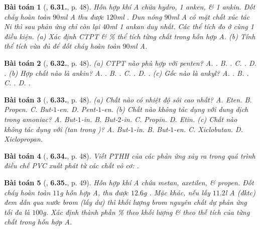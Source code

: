 \documentclass{article}
\numberwithin{equation}{section}
\newtheorem{baitoan}{Bài toán}[section]
\begin{document}
\begin{baitoan}[\cite{SBT_Hoa_Hoc_11_co_ban}, \textbf{6.31.}, p. 48]
	Hỗn hợp khí A chứa hydro, 1 anken, \& 1 ankin. Đốt cháy hoàn toàn $90$\emph{ml} A thu được $120$\emph{ml} \emph{}. Đun nóng $90$\emph{ml} A có mặt chất xúc tác \emph{Ni} thì sau phản ứng chỉ còn lại $40$\emph{ml} 1 ankan duy nhất. Các thể tích đo ở cùng 1 điều kiện. (a) Xác định CTPT \& \% thể tích từng chất trong hỗn hợp A. (b) Tính thể tích \emph{} vừa đủ để đốt cháy hoàn toàn $90$\emph{ml} A.
\end{baitoan}

\begin{baitoan}[\cite{SBT_Hoa_Hoc_11_co_ban}, \textbf{6.32.}, p. 48]
	(a) CTPT nào phù hợp với penten? {\sf A.} \emph{}. {\sf B.} \emph{}. {\sf C.} \emph{}. {\sf D.} \emph{}. (b) Hợp chất nào là ankin? {\sf A.} \emph{}. {\sf B.} \emph{}. {\sf C.} \emph{}. {\sf D.} \emph{}. (c) Gốc nào là ankyl? {\sf A.} \emph{}. {\sf B.} \emph{}. {\sf C.} \emph{}. {\sf D.} \emph{}.
\end{baitoan}

\begin{baitoan}[\cite{SBT_Hoa_Hoc_11_co_ban}, \textbf{6.33.}, p. 48]
	(a) Chất nào có nhiệt độ sôi cao nhất? {\sf A.} Eten. {\sf B.} Propen. {\sf C.} But-$1$-en. {\sf D.} Pent-$1$-en. (b) Chất nào không tác dụng với dung dịch \emph{} trong amoniac? {\sf A.} But-$1$-in. {\sf B.} But-$2$-in. {\sf C.} Propin. {\sf D.} Etin. (c) Chất nào không tác dụng với \emph{} (tan trong \emph{})? {\sf A.} But-$1$-in. {\sf B.} But-$1$-en. {\sf C.} Xiclobutan. {\sf D.} Xiclopropan.
\end{baitoan}

\begin{baitoan}[\cite{SBT_Hoa_Hoc_11_co_ban}, \textbf{6.34.}, p. 48]
	Viết PTHH của các phản ứng xảy ra trong quá trình điều chế PVC xuất phát từ các chất vô cơ: \emph{}.
\end{baitoan}

\begin{baitoan}[\cite{SBT_Hoa_Hoc_11_co_ban}, \textbf{6.35.}, p. 49]
	Hỗn hợp khí A chứa metan, axetilen, \& propen. Đốt cháy hoàn toàn $11$\emph{g} hỗn hợp A, thu được $12.6$\emph{g }. Mặc khác, nếu lấy $11.2$\emph{l} A (đktc) đem dẫn qua nước brom (lấy dư) thì khối lượng brom nguyên chất dự phản ứng tối đa là $100$\emph{g}. Xác định thành phần \% theo khối lượng \& theo thế tích của từng chất trong hỗn hợp A.
\end{baitoan}
\end{document}
